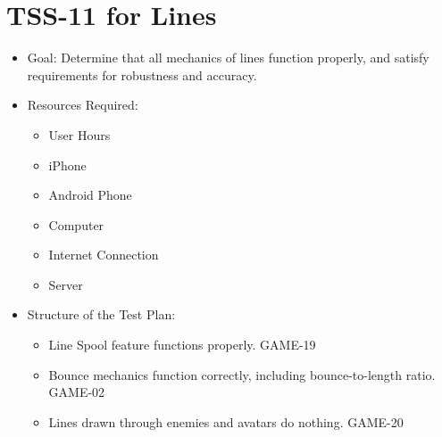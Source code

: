 \section{TSS-11 for Lines}
\begin{itemize}
\item Goal: Determine that all mechanics of lines function properly, and satisfy requirements
for robustness and accuracy.

\item Resources Required:
\begin{itemize}
\item User Hours 
\item iPhone 
\item Android Phone 
\item Computer 
\item Internet Connection 
\item Server
\end{itemize}
\item Structure of the Test Plan: 

\begin{itemize}

\item Line Spool feature functions properly. GAME-19
\item Bounce mechanics function correctly, including bounce-to-length ratio. GAME-02
\item Lines drawn through enemies and avatars do nothing. GAME-20

\end{itemize}
\end{itemize}

